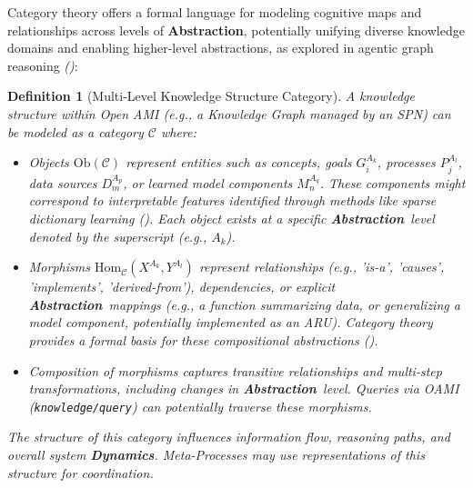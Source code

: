 \documentclass[12pt,a4paper]{report}
\renewcommand{\citep}[1]{\textit{\scriptsize{(\cite{#1})}}}
\newtheorem{definition}{Definition}[section]
\newcommand{\Abstraction}{\textbf{Abstraction}}
\newcommand{\Dynamics}{\textbf{Dynamics}}
\begin{document}
	Category theory offers a formal language for modeling cognitive maps and relationships across levels of \Abstraction, potentially unifying diverse knowledge domains and enabling higher-level abstractions, as explored in agentic graph reasoning \citep{Buehler2025AgenticGraphRef}:
	
	\begin{definition}[Multi-Level Knowledge Structure Category]
		\label{def:knowledge_category}
		A knowledge structure within Open AMI (e.g., a Knowledge Graph managed by an SPN) can be modeled as a category $\mathcal{C}$ where:
		\begin{itemize}
			\item Objects $\text{Ob}(\mathcal{C})$ represent entities such as concepts, goals $G_i^{A_k}$, processes $P_j^{A_l}$, data sources $D_m^{A_p}$, or learned model components $M_n^{A_q}$. These components might correspond to interpretable features identified through methods like sparse dictionary learning \citep{Anthropic_Decompose_2023}. Each object exists at a specific \Abstraction\ level denoted by the superscript (e.g., $A_k$).
			\item Morphisms $\text{Hom}_\mathcal{C}(X^{A_k}, Y^{A_l})$ represent relationships (e.g., 'is-a', 'causes', 'implements', 'derived-from'), dependencies, or explicit \Abstraction\ mappings (e.g., a function summarizing data, or generalizing a model component, potentially implemented as an ARU). Category theory provides a formal basis for these compositional abstractions \citep{Buehler2025AgenticGraphRef}.
			\item Composition of morphisms captures transitive relationships and multi-step transformations, including changes in \Abstraction\ level. Queries via OAMI (\texttt{knowledge/query}) can potentially traverse these morphisms.
		\end{itemize}
		The structure of this category influences information flow, reasoning paths, and overall system \Dynamics. Meta-Processes may use representations of this structure for coordination.
	\end{definition}
	
\end{document}
